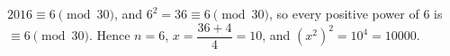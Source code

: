 $2016\equiv6\pmod{30}$, and $6^2=36\equiv6\pmod{30}$, so every positive power of $6$ is $\equiv6\pmod{30}$. Hence $n=6$, $x=\dfrac{36+4}{4}=10$, and $\left(x^2\right)^2=10^4=\boxed{10000}$.
